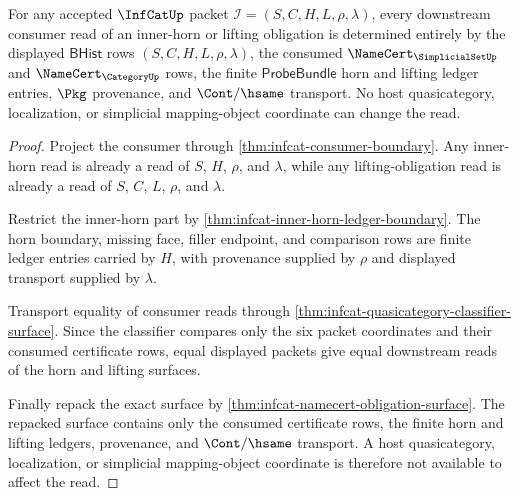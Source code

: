 \begin{theorem}
\label{thm:infcat-inner-horn-consumer-determinacy}
For any accepted $\InfCatUp$ packet
$\mathcal{I}=(S,C,H,L,\rho,\lambda)$, every downstream consumer read of an
inner-horn or lifting obligation is determined entirely by the displayed
$\mathsf{BHist}$ rows $(S,C,H,L,\rho,\lambda)$, the consumed
$\NameCert_{\SimplicialSetUp}$ and $\NameCert_{\CategoryUp}$ rows, the finite
$\mathsf{ProbeBundle}$ horn and lifting ledger entries, $\Pkg$ provenance, and
$\Cont/\hsame$ transport. No host quasicategory, localization, or simplicial
mapping-object coordinate can change the read.
\end{theorem}
\begin{proof}
Project the consumer through \autoref{thm:infcat-consumer-boundary}. Any
inner-horn read is already a read of $S$, $H$, $\rho$, and $\lambda$, while any
lifting-obligation read is already a read of $S$, $C$, $L$, $\rho$, and
$\lambda$.

Restrict the inner-horn part by
\autoref{thm:infcat-inner-horn-ledger-boundary}. The horn boundary, missing
face, filler endpoint, and comparison rows are finite ledger entries carried by
$H$, with provenance supplied by $\rho$ and displayed transport supplied by
$\lambda$.

Transport equality of consumer reads through
\autoref{thm:infcat-quasicategory-classifier-surface}. Since the classifier
compares only the six packet coordinates and their consumed certificate rows,
equal displayed packets give equal downstream reads of the horn and lifting
surfaces.

Finally repack the exact surface by
\autoref{thm:infcat-namecert-obligation-surface}. The repacked surface contains
only the consumed certificate rows, the finite horn and lifting ledgers,
provenance, and $\Cont/\hsame$ transport. A host quasicategory, localization,
or simplicial mapping-object coordinate is therefore not available to affect
the read.
\end{proof}

